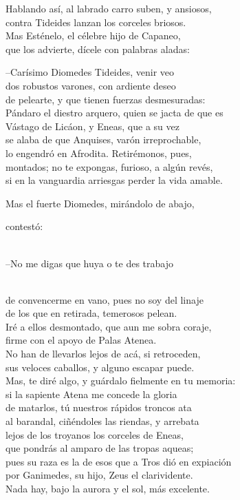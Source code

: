 \documentclass[11pt,twoside]{article}
\newcommand{\dlgo}[2]{\sbox{\dbox}{#1}\parbox[t]{\linewidth}{#1\strut\\[0pt]\hspace*{\wd\dbox}\hspace{\fontdimen2\font}#2\strut}}
\begin{document}
Hablando así, al labrado carro suben, y ansiosos,\\
contra Tideides lanzan los corceles briosos.\\
Mas Esténelo, el célebre hijo de Capaneo,\\
que los advierte, dícele con palabras aladas:\par
--Carísimo Diomedes Tideides, venir veo\\
dos robustos varones, con ardiente deseo\\
de pelearte, y que tienen fuerzas desmesuradas:\\
Pándaro el diestro arquero, quien se jacta de que es\\
Vástago de Licáon, y Eneas, que a su vez\\
se alaba de que Anquises, varón irreprochable,\\
lo engendró en Afrodita. Retirémonos, pues,\\
montados; no te expongas, furioso, a algún revés,\\
si en la vanguardia arriesgas perder la vida amable.\par
Mas el fuerte Diomedes, mirándolo de abajo,\\
\dlgo{contestó:}{--No me digas que huya o te des trabajo}\\
de convencerme en vano, pues no soy del linaje\\
de los que en retirada, temerosos pelean.\\
Iré a ellos desmontado, que aun me sobra coraje,\\
firme con el apoyo de Palas Atenea.\\
No han de llevarlos lejos de acá, si retroceden,\\
sus veloces caballos, y alguno escapar puede.\\
Mas, te diré algo, y guárdalo fielmente en tu memoria:\\
si la sapiente Atena me concede la gloria\\
de matarlos, tú nuestros rápidos troncos ata\\
al barandal, ciñéndoles las riendas, y arrebata\\
lejos de los troyanos los corceles de Eneas,\\
que pondrás al amparo de las tropas aqueas;\\
pues su raza es la de esos que a Tros dió en expiación\\
por Ganimedes, su hijo, Zeus el clarividente.\\
Nada hay, bajo la aurora y el sol, más excelente.\\
\end{document}
